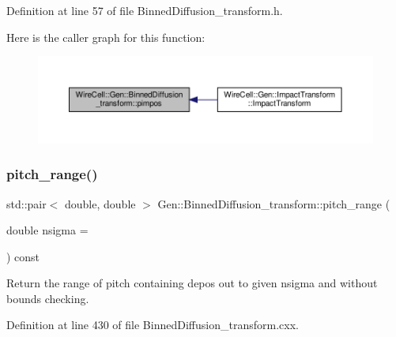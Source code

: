 Definition at line 57 of file Binned\+Diffusion\+\_\+transform.\+h.

Here is the caller graph for this function\+:
\nopagebreak
\begin{figure}[H]
\begin{center}
\leavevmode
\includegraphics[width=350pt]{class_wire_cell_1_1_gen_1_1_binned_diffusion__transform_a5da47771953721da39a78625d1845363_icgraph}
\end{center}
\end{figure}
\mbox{\label{class_wire_cell_1_1_gen_1_1_binned_diffusion__transform_a930b6511084f18a355737ca78cbc5bb8}} 
\subsubsection{\texorpdfstring{pitch\+\_\+range()}{pitch\_range()}}
{\footnotesize\ttfamily std\+::pair$<$ double, double $>$ Gen\+::\+Binned\+Diffusion\+\_\+transform\+::pitch\+\_\+range (\begin{DoxyParamCaption}\item[{double}]{nsigma = {} }\end{DoxyParamCaption}) const}

Return the range of pitch containing depos out to given nsigma and without bounds checking. 

Definition at line 430 of file Binned\+Diffusion\+\_\+transform.\+cxx.

